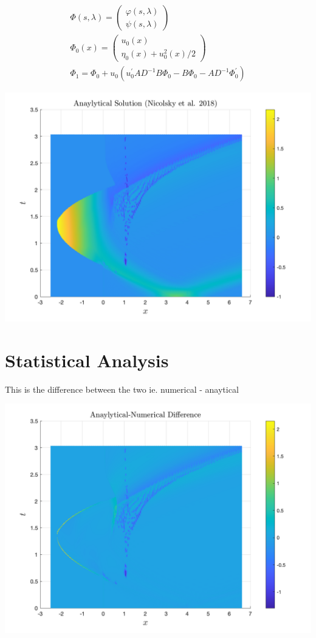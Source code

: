 \documentclass{article}
\begin{document}
\[
\begin{aligned}
\Phi (s,\lambda) = \begin{pmatrix}
\varphi(s,\lambda) \\
\psi(s,\lambda)
\end{pmatrix} \\
\Phi_0(x) =  \begin{pmatrix}
u_0(x) \\
\eta_0(x) + u_0^2(x)/2
\end{pmatrix} \\
\Phi_1 = \Phi_0 + u_0(u_0^\prime A D^{-1} B \Phi_0 - B \Phi_0 - A D^{-1} \Phi_0^\prime)
\end{aligned}
\]

\includegraphics[width=\linewidth]{ana.png}

\section{Statistical Analysis}

This is the difference between the two ie. numerical - anaytical

\includegraphics[width=\linewidth]{diff.png}
\end{document}
